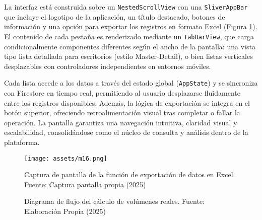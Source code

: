 La interfaz está construida sobre un \texttt{NestedScrollView} con una \texttt{SliverAppBar} que incluye el logotipo de la aplicación, un título destacado, botones de información y una opción para exportar los registros en formato Excel (Figura \ref{pantallas15}). El contenido de cada pestaña es renderizado mediante un \texttt{TabBarView}, que carga condicionalmente componentes diferentes según el ancho de la pantalla: una vista tipo lista detallada para escritorios (estilo Master-Detail), o bien listas verticales desplazables con controladores independientes en entornos móviles.

Cada lista accede a los datos a través del estado global (\texttt{AppState}) y se sincroniza con Firestore en tiempo real, permitiendo al usuario desplazarse fluidamente entre los registros disponibles. Además, la lógica de exportación se integra en el botón superior, ofreciendo retroalimentación visual tras completar o fallar la operación. La pantalla garantiza una navegación intuitiva, claridad visual y escalabilidad, consolidándose como el núcleo de consulta y análisis dentro de la plataforma. 

\begin{figure}[h!]
\centering 
  \texttt{[image: assets/m16.png]}
  \caption{Captura de pantalla de la función de exportación de datos en Excel. Fuente: Captura pantalla propia (2025)}
  \label{pantallas15}
\end{figure}

\begin{figure}[H]
\centering
{}
\caption{Diagrama de flujo del cálculo de volúmenes reales. Fuente: Elaboración Propia (2025)}
\label{fig:diagramavolumenes}
\end{figure}


